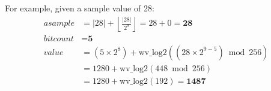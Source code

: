 \par
\noindent
For example, given a sample value of 28:
\begin{align*}
asample &= |28| + \left\lfloor\frac{|28|}{2^9}\right\rfloor = 28 + 0 = \textbf{28} \\
bitcount &= \textbf{5} \\
value &= (5 \times 2^8) + \text{wv\_log2}((28 \times 2^{9 - 5}) \bmod{256}) \\
&= 1280 + \text{wv\_log2}(448 \bmod{256}) \\
&= 1280 + \text{wv\_log2}(192) = \textbf{1487}
\end{align*}

